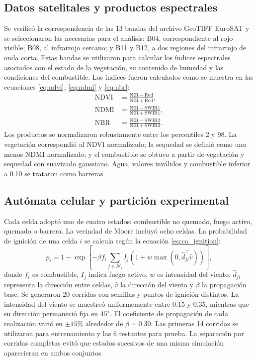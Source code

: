 \documentclass[fleqn,10pt]{wlscirep}
\begin{document}
\subsection*{Datos satelitales y productos espectrales}

Se verificó la correspondencia de las 13 bandas del archivo GeoTIFF EuroSAT y se seleccionaron las necesarias para el análisis: B04, correspondiente al rojo visible; B08, al infrarrojo cercano; y B11 y B12, a dos regiones del infrarrojo de onda corta. Estas bandas se utilizaron para calcular los índices espectrales asociados con el estado de la vegetación, su contenido de humedad y las condiciones del combustible.
Los índices fueron calculados como se muestra en las ecuaciones \ref{eq:ndvi}, \ref{eq:ndmi} y \ref{eq:nbr}:
\begin{align}
\mathrm{NDVI}&=\frac{\mathrm{NIR}-\mathrm{Red}}{\mathrm{NIR}+\mathrm{Red}}, \label{eq:ndvi} \\
\mathrm{NDMI}&=\frac{\mathrm{NIR}-\mathrm{SWIR1}}{\mathrm{NIR}+\mathrm{SWIR1}}, \label{eq:ndmi} \\
\mathrm{NBR}&=\frac{\mathrm{NIR}-\mathrm{SWIR2}}{\mathrm{NIR}+\mathrm{SWIR2}}. \label{eq:nbr}
\end{align}
Los productos se normalizaron robustamente entre los percentiles 2 y 98. La vegetación correspondió al NDVI normalizado; la sequedad se definió como uno menos NDMI normalizado; y el combustible se obtuvo a partir de vegetación y sequedad con suavizado gaussiano. Agua, valores inválidos y combustible inferior a 0.10 se trataron como barreras.

\subsection*{Autómata celular y partición experimental}

Cada celda adoptó uno de cuatro estados: combustible no quemado, fuego activo, quemado o barrera. La vecindad de Moore incluyó ocho celdas. La probabilidad de ignición de una celda $i$ se calcula según la ecuación \ref{eq:ca_ignition}:
\begin{equation}
p_i=1-\exp\left[-\beta f_i\sum_{j\in\mathcal{N}_i}I_j
\left(1+w\max(0,\hat{d}_{ji}^{\top}\hat{v})\right)\right], \label{eq:ca_ignition}
\end{equation}
donde $f_i$ es combustible, $I_j$ indica fuego activo, $w$ es intensidad del viento, $\hat{d}_{ji}$ representa la dirección entre celdas, $\hat{v}$ la dirección del viento y $\beta$ la propagación base. Se generaron 20 corridas con semillas y puntos de ignición distintos. La intensidad del viento se muestreó uniformemente entre 0.15 y 0.35, mientras que su dirección permaneció fija en $45^\circ$. El coeficiente de propagación de cada realización varió en $\pm15\%$ alrededor de $\beta=0.30$. Las primeras 14 corridas se utilizaron para entrenamiento y las 6 restantes para prueba. La separación por corridas completas evitó que estados sucesivos de una misma simulación aparecieran en ambos conjuntos.
\end{document}
